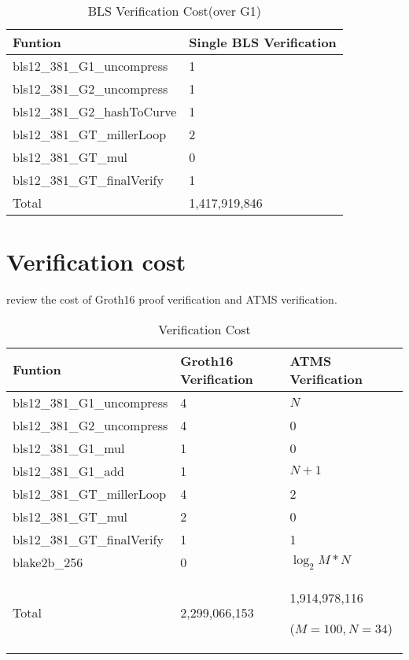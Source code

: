 \documentclass{article}
\begin{document}
\begin{table}[H]
    \centering
    \begin{tabular}{p{5cm}|p{4cm}} \hline
         Funtion & Single BLS Verification\\ \hline
         bls12\_381\_G1\_uncompress&  1 \\ \hline
         bls12\_381\_G2\_uncompress&  1  \\ \hline
         bls12\_381\_G2\_hashToCurve&  1 \\ \hline
         bls12\_381\_GT\_millerLoop  & 2  \\ \hline
         bls12\_381\_GT\_mul         & 0  \\ \hline
         bls12\_381\_GT\_finalVerify & 1 \\ \hline
         Total & 1,417,919,846 \\ \hline
    \end{tabular}
    \caption{BLS Verification Cost(over G1)}
    \label{tab:my_label}
\end{table}

\section{Verification cost}
review the cost of Groth16 proof verification and ATMS verification.

\begin{table}[H]
    \centering
    \begin{tabular}{p{5cm}|p{4cm}|p{4cm}} \hline
         Funtion & Groth16 Verification & ATMS Verification  \\ \hline
         bls12\_381\_G1\_uncompress&  4 & $N$ \\ \hline
         bls12\_381\_G2\_uncompress&  4 & 0 \\ \hline
         bls12\_381\_G1\_mul&  1 & 0 \\ \hline
         bls12\_381\_G1\_add&  1 & $N+1$ \\ \hline
         bls12\_381\_GT\_millerLoop  & 4 & 2 \\ \hline
         bls12\_381\_GT\_mul         & 2 & 0 \\ \hline
         bls12\_381\_GT\_finalVerify & 1 & 1 \\ \hline
         blake2b\_256 & 0 &  $\log_2M *N$  \\ \hline
         Total & 2,299,066,153 & 1,914,978,116
         
         ($M=100, N=34$) \\ \hline
    \end{tabular}
    \caption{Verification Cost}
    \label{tab:my_label}
\end{table}
\end{document}
